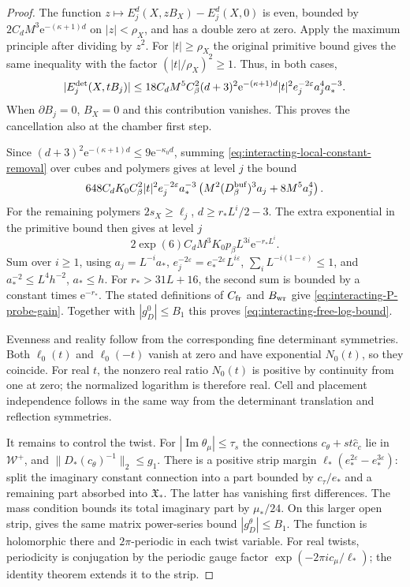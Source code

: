 \begin{proof}
The function
$z\mapsto E_j^d(X,zB_X)-E_j^d(X,0)$ is even,
bounded by $2C_dM^3\mathrm e^{-(\kappa+1)d}$ on
$|z|<\rho_X$, and has a double zero at zero.
Apply the maximum principle after dividing
by $z^2$. For $|t|\ge\rho_X$ the original
primitive bound gives the same inequality
with the factor $(|t|/\rho_X)^2\ge1$.
Thus, in both cases,
\begin{equation}\label{eq:interacting-local-constant-removal}
 |E_j^{\rm det}(X,tB_j)|\le
 18C_dM^5C_\beta^2(d+3)^2\mathrm e^{-(\kappa+1)d}
          |t|^2e_j^{-2\varepsilon}a_j^4a_*^{-3}.
\end{equation}
When $\partial B_j=0$, $B_X=0$ and this contribution
vanishes. This proves the cancellation also
at the chamber first step.

Since $(d+3)^2\mathrm e^{-(\kappa+1)d}\le9\mathrm e^{-\kappa_0d}$,
summing \eqref{eq:interacting-local-constant-removal}
over cubes and polymers gives at level $j$
the bound
\[
 648C_dK_0C_\beta^2|t|^2e_j^{-2\varepsilon}a_*^{-3}
           \left(M^2(D_\beta^{\rm buf})^3a_j+8M^5a_j^4\right).
\]
For the remaining polymers $2s_X\ge\ell_j$,
$d\ge r_*L^i/2-3$. The extra exponential in
the primitive bound then gives at level $j$
\[
 2\exp(6)C_dM^3K_0p_\beta L^{3i}\mathrm e^{-r_*L^i}.
\]
Sum over $i\ge1$, using $a_j=L^{-i}a_*$,
$e_j^{-2\varepsilon}=e_*^{-2\varepsilon}L^{i\varepsilon}$,
$\sum_iL^{-i(1-\varepsilon)}\le1$, and
$a_*^{-2}\le L^4h^{-2}$, $a_*\le h$.
For $r_*>31L+16$, the second sum is bounded
by a constant times $\mathrm e^{-r_*}$.
The stated definitions of $C_{\rm fr}$ and
$B_{\rm wr}$ give \eqref{eq:interacting-P-probe-gain}.
Together with $|g_D^0|\le B_1$ this proves
\eqref{eq:interacting-free-log-bound}.

Evenness and reality follow from the corresponding
fine determinant symmetries. Both $\ell_0(t)$
and $\ell_0(-t)$ vanish at zero and have
exponential $N_0(t)$, so they coincide.
For real $t$, the nonzero real ratio $N_0(t)$
is positive by continuity from one at zero;
the normalized logarithm is therefore real.
Cell and placement independence follows in
the same way from the determinant translation
and reflection symmetries.

It remains to control the twist. For
$|\operatorname{Im}\theta_\mu|\le\tau_s$
the connections $c_\theta+st\widehat c_c$
lie in $\mathcal W^+$, and
$\|D_*(c_\theta)^{-1}\|_2\le g_1$.
There is a positive strip margin
$\ell_*(e_*^{2\varepsilon}-e_*^{3\varepsilon})$:
split the imaginary constant connection
into a part bounded by $c_\tau/e_*$ and a
remaining part absorbed into $\mathfrak X_*$.
The latter has vanishing first differences.
The mass condition bounds its total imaginary
part by $\mu_*/24$. On this larger open strip,
\cite[(73)]{TerminalPressure} gives
the same matrix power-series bound $|g_D^\theta|\le B_1$.
The function is holomorphic there and
$2\pi$-periodic in each twist variable.
For real twists, periodicity is conjugation by
the periodic gauge factor
$\exp(-2\pi i c_\mu/\ell_*)$; the identity
theorem extends it to the strip.


\end{proof}
